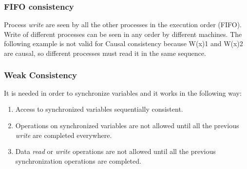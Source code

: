 \subsubsection{FIFO consistency}
Process \textit{write} are seen by all the other processes in the execution order (FIFO). Write of different processes can be seen in any order by different machines. The following example is not valid for Causal consistency because W(x)1 and W(x)2 are causal, so different processes must read it in the same sequence.

\subsubsection{Weak Consistency}
It is needed in order to synchronize variables and it works in the following way:
\begin{enumerate}
	\item Access to synchronized variables sequentially consistent.
	\item Operations on synchronized variables are not allowed until all the previous
	\textit{write} are completed everywhere.
	\item Data \textit{read} or \textit{write} operations are not allowed until all the previous synchronization operations are completed.
\end{enumerate}

